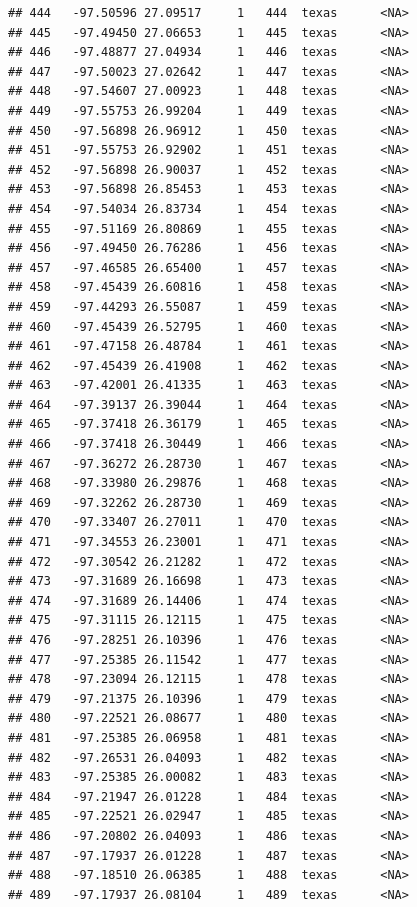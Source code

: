 \documentclass[
]{article}
\begin{document}
\begin{verbatim}
## 444   -97.50596 27.09517     1   444  texas      <NA>
## 445   -97.49450 27.06653     1   445  texas      <NA>
## 446   -97.48877 27.04934     1   446  texas      <NA>
## 447   -97.50023 27.02642     1   447  texas      <NA>
## 448   -97.54607 27.00923     1   448  texas      <NA>
## 449   -97.55753 26.99204     1   449  texas      <NA>
## 450   -97.56898 26.96912     1   450  texas      <NA>
## 451   -97.55753 26.92902     1   451  texas      <NA>
## 452   -97.56898 26.90037     1   452  texas      <NA>
## 453   -97.56898 26.85453     1   453  texas      <NA>
## 454   -97.54034 26.83734     1   454  texas      <NA>
## 455   -97.51169 26.80869     1   455  texas      <NA>
## 456   -97.49450 26.76286     1   456  texas      <NA>
## 457   -97.46585 26.65400     1   457  texas      <NA>
## 458   -97.45439 26.60816     1   458  texas      <NA>
## 459   -97.44293 26.55087     1   459  texas      <NA>
## 460   -97.45439 26.52795     1   460  texas      <NA>
## 461   -97.47158 26.48784     1   461  texas      <NA>
## 462   -97.45439 26.41908     1   462  texas      <NA>
## 463   -97.42001 26.41335     1   463  texas      <NA>
## 464   -97.39137 26.39044     1   464  texas      <NA>
## 465   -97.37418 26.36179     1   465  texas      <NA>
## 466   -97.37418 26.30449     1   466  texas      <NA>
## 467   -97.36272 26.28730     1   467  texas      <NA>
## 468   -97.33980 26.29876     1   468  texas      <NA>
## 469   -97.32262 26.28730     1   469  texas      <NA>
## 470   -97.33407 26.27011     1   470  texas      <NA>
## 471   -97.34553 26.23001     1   471  texas      <NA>
## 472   -97.30542 26.21282     1   472  texas      <NA>
## 473   -97.31689 26.16698     1   473  texas      <NA>
## 474   -97.31689 26.14406     1   474  texas      <NA>
## 475   -97.31115 26.12115     1   475  texas      <NA>
## 476   -97.28251 26.10396     1   476  texas      <NA>
## 477   -97.25385 26.11542     1   477  texas      <NA>
## 478   -97.23094 26.12115     1   478  texas      <NA>
## 479   -97.21375 26.10396     1   479  texas      <NA>
## 480   -97.22521 26.08677     1   480  texas      <NA>
## 481   -97.25385 26.06958     1   481  texas      <NA>
## 482   -97.26531 26.04093     1   482  texas      <NA>
## 483   -97.25385 26.00082     1   483  texas      <NA>
## 484   -97.21947 26.01228     1   484  texas      <NA>
## 485   -97.22521 26.02947     1   485  texas      <NA>
## 486   -97.20802 26.04093     1   486  texas      <NA>
## 487   -97.17937 26.01228     1   487  texas      <NA>
## 488   -97.18510 26.06385     1   488  texas      <NA>
## 489   -97.17937 26.08104     1   489  texas      <NA>

\end{verbatim}
\end{document}
